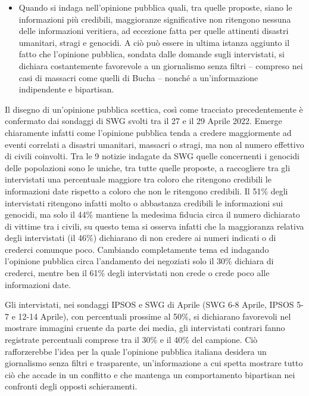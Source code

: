 \documentclass[
]{book}
\providecommand{\tightlist}{%
  \setlength{\itemsep}{0pt}\setlength{\parskip}{0pt}}
\begin{document}
\begin{itemize}
\tightlist
\item
  Quando si indaga nell'opinione pubblica quali, tra quelle proposte, siano le informazioni più credibili, maggioranze significative non ritengono nessuna delle informazioni veritiera, ad eccezione fatta per quelle attinenti disastri umanitari, stragi e genocidi. A ciò può essere in ultima istanza aggiunto il fatto che l'opinione pubblica, sondata dalle domande sugli intervistati, si dichiara costantemente favorevole a un giornalismo senza filtri -- compreso nei casi di massacri come quelli di Bucha -- nonché a un'informazione indipendente e bipartisan.
\end{itemize}

Il disegno di un'opinione pubblica scettica, così come tracciato precedentemente è confermato dai sondaggi di SWG svolti tra il 27 e il 29 Aprile 2022. Emerge chiaramente infatti come l'opinione pubblica tenda a credere maggiormente ad eventi correlati a disastri umanitari, massacri o stragi, ma non al numero effettivo di civili coinvolti. Tra le 9 notizie indagate da SWG quelle concernenti i genocidi delle popolazioni sono le uniche, tra tutte quelle proposte, a raccogliere tra gli intervistati una percentuale maggiore tra coloro che ritengono credibili le informazioni date rispetto a coloro che non le ritengono credibili. Il 51\% degli intervistati ritengono infatti molto o abbastanza credibili le informazioni sui genocidi, ma solo il 44\% mantiene la medesima fiducia circa il numero dichiarato di vittime tra i civili, su questo tema si osserva infatti che la maggioranza relativa degli intervistati (il 46\%) dichiarano di non credere ai numeri indicati o di crederci comunque poco.
Cambiando completamente tema ed indagando l'opinione pubblica circa l'andamento dei negoziati solo il 30\% dichiara di crederci, mentre ben il 61\% degli intervistati non crede o crede poco alle informazioni date.

Gli intervistati, nei sondaggi IPSOS e SWG di Aprile (SWG 6-8 Aprile, IPSOS 5-7 e 12-14 Aprile), con percentuali prossime al 50\%, si dichiarano favorevoli nel mostrare immagini cruente da parte dei media, gli intervistati contrari fanno registrate percentuali comprese tra il 30\% e il 40\% del campione. Ciò rafforzerebbe l'idea per la quale l'opinione pubblica italiana desidera un giornalismo senza filtri e trasparente, un'informazione a cui spetta mostrare tutto ciò che accade in un conflitto e che mantenga un comportamento bipartisan nei confronti degli opposti schieramenti.
\end{document}
